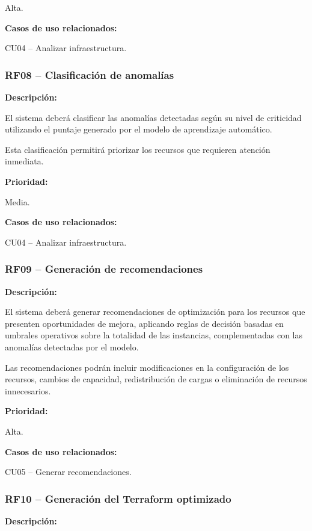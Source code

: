 Alta.

\noindent \textbf{Casos de uso relacionados:}

\noindent CU04 -- Analizar infraestructura.

\subsubsection{RF08 -- Clasificación de anomalías}

\noindent \textbf{Descripción:}

El sistema deberá clasificar las anomalías detectadas según su nivel de criticidad utilizando el puntaje generado por el modelo de aprendizaje automático.

Esta clasificación permitirá priorizar los recursos que requieren atención inmediata.

\noindent \textbf{Prioridad:}

Media.

\noindent \textbf{Casos de uso relacionados:}

\noindent CU04 -- Analizar infraestructura.

\subsubsection{RF09 -- Generación de recomendaciones}

\noindent \textbf{Descripción:}

El sistema deberá generar recomendaciones de optimización para los recursos que presenten oportunidades de mejora, aplicando reglas de decisión basadas en umbrales operativos sobre la totalidad de las instancias, complementadas con las anomalías detectadas por el modelo.

Las recomendaciones podrán incluir modificaciones en la configuración de los recursos, cambios de capacidad, redistribución de cargas o eliminación de recursos innecesarios.

\noindent \textbf{Prioridad:}

Alta.

\noindent \textbf{Casos de uso relacionados:}

\noindent CU05 -- Generar recomendaciones.

\subsubsection{RF10 -- Generación del Terraform optimizado}

\noindent \textbf{Descripción:}

